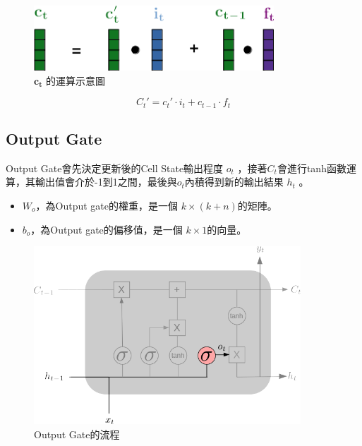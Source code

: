 \begin{figure}[H]
	\centering
	\includegraphics[width=9cm]{./pic/Qff4EdKi.png}
	\caption{\(\mathbf{c_t}\) 的運算示意圖}
	\label{fig:CellStateUpdateCaculate}
\end{figure}

\begin{equation}
	\label{eqn:InputCalculate}
	C_t' = c_t'\cdot i_t + c_{t-1}\cdot f_t 
\end{equation}



\subsection{Output Gate}

Output Gate會先決定更新後的Cell State輸出程度 \(o_t\) ，接著\(C_t\)會進行tanh函數運算，其輸出值會介於-1到1之間，最後與\(o_t\)內積得到新的輸出結果 \(h_t\) 。

\begin{itemize}

	\item 
		\(W_o\)，為Output gate的權重，是一個 \(k \times (k+n)\)的矩陣。

	\item 
		\(b_o\)，為Output gate的偏移值，是一個 \(k \times 1\)的向量。

\end{itemize}

\begin{figure}[H]
	\centering
	\includegraphics[width=10cm]{./pic/e9dbHfq4.png}
	\caption{Output Gate的流程}
	\label{fig:OutputGate}
\end{figure}


